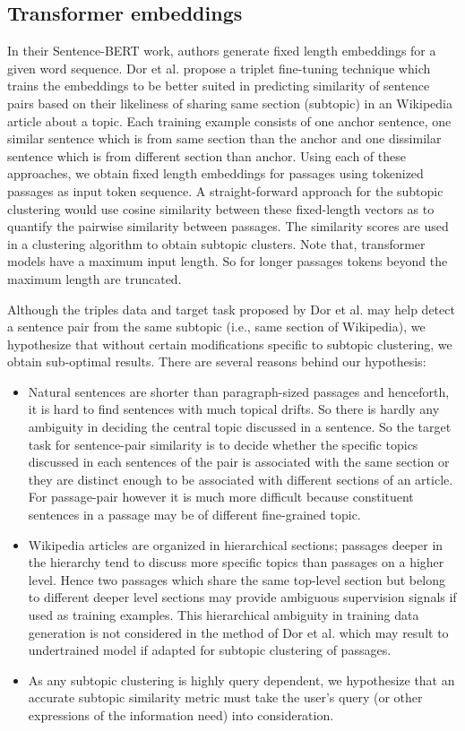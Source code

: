 \subsection{Transformer embeddings} In their Sentence-BERT work, authors generate fixed length embeddings for a given word sequence. Dor et al. \cite{dor2018learning} propose a triplet fine-tuning technique which trains the embeddings to be better suited in predicting similarity of sentence pairs based on their likeliness of sharing same section (subtopic) in an Wikipedia article about a topic. Each training example consists of one anchor sentence, one similar sentence which is from same section than the anchor and one dissimilar sentence which is from different section than anchor. Using each of these approaches, we obtain fixed length embeddings for passages using tokenized passages as input token sequence. A straight-forward approach for the subtopic clustering would use cosine similarity between these fixed-length vectors as to quantify the pairwise similarity between passages. The similarity scores are used in  a clustering algorithm to obtain subtopic clusters. Note that, transformer models have a maximum input length. So for longer passages tokens beyond the maximum length are truncated.

Although the triples data and target task proposed by Dor et al. may help detect a sentence pair from the same subtopic (i.e., same section of Wikipedia), we hypothesize that without certain modifications specific to subtopic clustering, we obtain sub-optimal results. There are several reasons behind our hypothesis: 
\begin{itemize}[leftmargin=.15in]
    \item Natural sentences are shorter than paragraph-sized passages and henceforth, it is hard to find sentences with much topical drifts. So there is hardly any ambiguity in deciding the central topic discussed in a sentence. So the target task for sentence-pair similarity is to decide whether the specific topics discussed in each sentences of the pair is associated with the same section or they are distinct enough to be associated with different sections of an article. For passage-pair however it is much more difficult because constituent sentences in a passage may be of different fine-grained topic.
    \item Wikipedia articles are organized in hierarchical sections; passages deeper in the hierarchy tend to discuss more specific topics than passages on a higher level. Hence two passages which share the same top-level section but belong to different deeper level sections may provide ambiguous supervision signals if used as training examples. This hierarchical ambiguity in training data generation is not considered in the method of Dor et al. which may result to undertrained model if adapted for subtopic clustering of passages.
    \item As any subtopic clustering is highly query dependent, we hypothesize that an accurate subtopic similarity metric must take the user's query (or other expressions of the information need) into consideration.
\end{itemize}


